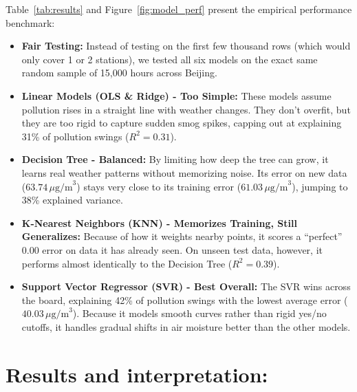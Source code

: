 \documentclass[a4paper,12pt,twocolumn]{article}
\begin{document}
Table~\ref{tab:results} and Figure~\ref{fig:model_perf} present the empirical performance benchmark:
\begin{itemize}
    \item \textbf{Fair Testing:} Instead of testing on the first few thousand rows (which would only cover 1 or 2 stations), we tested all six models on the exact same random sample of 15,000 hours across Beijing.
    \item \textbf{Linear Models (OLS \& Ridge) - Too Simple:} These models assume pollution rises in a straight line with weather changes. They don't overfit, but they are too rigid to capture sudden smog spikes, capping out at explaining 31\% of pollution swings ($R^2 = 0.31$).
    \item \textbf{Decision Tree - Balanced:} By limiting how deep the tree can grow, it learns real weather patterns without memorizing noise. Its error on new data ($63.74\,\mu\text{g/m}^3$) stays very close to its training error ($61.03\,\mu\text{g/m}^3$), jumping to 38\% explained variance.
    \item \textbf{K-Nearest Neighbors (KNN) - Memorizes Training, Still Generalizes:} Because of how it weights nearby points, it scores a ``perfect'' 0.00 error on data it has already seen. On unseen test data, however, it performs almost identically to the Decision Tree ($R^2 = 0.39$).
    \item \textbf{Support Vector Regressor (SVR) - Best Overall:} The SVR wins across the board, explaining 42\% of pollution swings with the lowest average error ($40.03\,\mu\text{g/m}^3$). Because it models smooth curves rather than rigid yes/no cutoffs, it handles gradual shifts in air moisture better than the other models.
\end{itemize}

\section{Results and interpretation:}
\label{sec:results}
\end{document}

